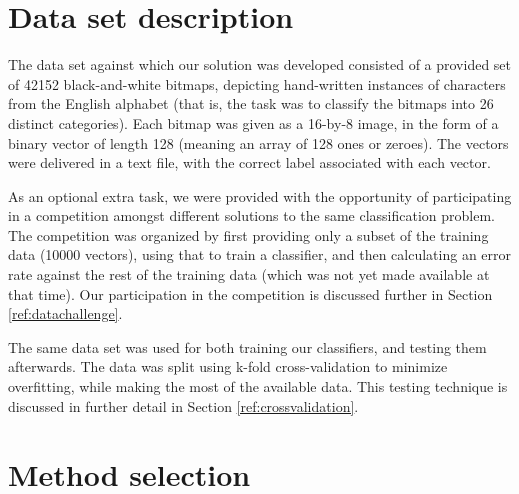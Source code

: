 \documentclass{netsec2012}
\begin{document}
\section{Data set description}

The data set against which our solution was developed consisted of a provided set of 42152
black-and-white bitmaps, depicting hand-written instances of characters from the English alphabet
(that is, the task was to classify the bitmaps into 26 distinct categories).  Each bitmap was given
as a 16-by-8 image, in the form of a binary vector of length 128 (meaning an array of 128 ones or
zeroes).  The vectors were delivered in a text file, with the correct label associated with each
vector.

\label{ref:datasetdescription}

As an optional extra task, we were provided with the opportunity of participating in a competition
amongst different solutions to the same classification problem.  The competition was organized by
first providing only a subset of the training data (10000 vectors), using that to train a
classifier, and then calculating an error rate against the rest of the training data (which was not
yet made available at that time).  Our participation in the competition is discussed further in
Section \ref{ref:datachallenge}.

The same data set was used for both training our classifiers, and testing them afterwards.  The data
was split using k-fold cross-validation to minimize overfitting, while making the most of the
available data.  This testing technique is discussed in further detail in Section
\ref{ref:crossvalidation}.

%
%
%

\section{Method selection}
\end{document}
